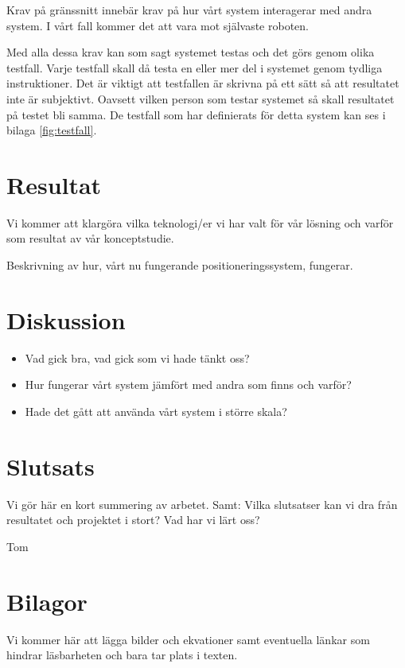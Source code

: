 \documentclass[11pt, a4paper]{report}
\begin{document}
Krav på gränssnitt innebär krav på hur vårt system interagerar med andra system. I vårt fall kommer det att vara mot självaste roboten.

Med alla dessa krav kan som sagt systemet testas och det görs genom olika testfall. Varje testfall skall då testa en eller mer del i systemet genom tydliga instruktioner. Det är viktigt att testfallen är skrivna på ett sätt så att resultatet inte är subjektivt. Oavsett vilken person som testar systemet så skall resultatet på testet bli samma. De testfall som har definierats för detta system kan ses i bilaga \ref{fig:testfall}.


\chapter{Resultat}
Vi kommer att klargöra vilka teknologi/er vi har valt för vår lösning och varför som resultat av vår konceptstudie.

Beskrivning av hur, vårt nu fungerande positioneringssystem, fungerar. 

\chapter{Diskussion}
\begin{itemize}
\item Vad gick bra, vad gick som vi hade tänkt oss?
\item Hur fungerar vårt system jämfört med andra som finns och varför?
\item Hade det gått att använda vårt system i större skala?
\end{itemize} 




\chapter{Slutsats}
Vi gör här en kort summering av arbetet.
Samt:
Vilka slutsatser kan vi dra från resultatet och projektet i stort?
Vad har vi lärt oss?






\newpage
\begin{thebibliography}{99}

 Tom

\end{thebibliography}

\chapter{Bilagor}
Vi kommer här att lägga bilder och ekvationer samt eventuella länkar som hindrar läsbarheten och bara tar plats i texten.
\end{document}
